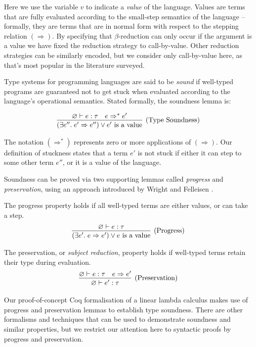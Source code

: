 \documentclass[]{unswthesis}
\let\emptyset\varnothing
\newcommand{\types}{\vdash}
\newcommand{\steps}{\Rightarrow}
\let\i\textit
\let\t\text
\begin{document}
Here we use the variable $v$ to indicate a \i{value} of the language. Values are terms that are fully evaluated according to the small-step semantics of the language \cite{tapl} -- formally, they are terms that are in normal form with respect to the stepping relation $(\steps)$. By specifying that $\beta$-reduction can only occur if the argument is a value we have fixed the reduction strategy to call-by-value. Other reduction strategies can be similarly encoded, but we consider only call-by-value here, as that's most popular in the literature surveyed.

Type systems for programming languages are said to be \i{sound} if well-typed programs are guaranteed not to get stuck when evaluated according to the language's operational semantics. Stated formally, the soundness lemma is:

\begin{eqnarray*}
\infer[\t{(Type Soundness)}]
{(\exists e''. \; e' \steps e'') \lor \t{$e'$ is a value}}
{\emptyset \types e : \tau  &  e \steps^* e'}
\end{eqnarray*}

The notation $(\steps^*)$ represents zero or more applications of $(\steps)$. Our definition of stuckness states that a term $e'$ is not stuck if either it can step to some other term $e''$, or it is a value of the language.

Soundness can be proved via two supporting lemmas called \i{progress} and \i{preservation}, using an approach introduced by Wright and Felleisen \cite{wright94}.

The progress property holds if all well-typed terms are either values, or can take a step.
\begin{eqnarray*}
\infer[\t{(Progress)}]
{(\exists e'. \; e \steps e') \lor \t{$e$ is a value}}
{\emptyset \types e : \tau}
\end{eqnarray*}

The preservation, or \i{subject reduction}, property holds if well-typed terms retain their type during evaluation.
\begin{eqnarray*}
\infer[\t{(Preservation)}]
{\emptyset \types e' : \tau}
{\emptyset \types e : \tau  &  e \steps e'}
\end{eqnarray*}

Our proof-of-concept Coq formalisation of a linear lambda calculus makes use of progress and preservation lemmas to establish type soundness. There are other formalisms and techniques that can be used to demonstrate soundness and similar properties, but we restrict our attention here to syntactic proofs by progress and preservation.
\end{document}
